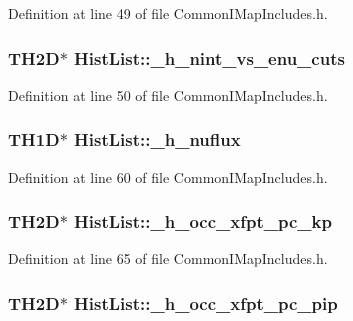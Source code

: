 Definition at line 49 of file Common\-I\-Map\-Includes.\-h.

\hypertarget{struct_hist_list_abad3b43d8ff27871b528111c3d11cef5}{
\subsubsection[{\-\_\-h\-\_\-nint\-\_\-vs\-\_\-enu\-\_\-cuts}]{\setlength{\rightskip}{0pt plus 5cm}T\-H2\-D$\ast$ Hist\-List\-::\-\_\-h\-\_\-nint\-\_\-vs\-\_\-enu\-\_\-cuts}}\label{struct_hist_list_abad3b43d8ff27871b528111c3d11cef5}


Definition at line 50 of file Common\-I\-Map\-Includes.\-h.

\hypertarget{struct_hist_list_af12f1c42bb40e8093ed4a05ea961a2ab}{
\subsubsection[{\-\_\-h\-\_\-nuflux}]{\setlength{\rightskip}{0pt plus 5cm}T\-H1\-D$\ast$ Hist\-List\-::\-\_\-h\-\_\-nuflux}}\label{struct_hist_list_af12f1c42bb40e8093ed4a05ea961a2ab}


Definition at line 60 of file Common\-I\-Map\-Includes.\-h.

\hypertarget{struct_hist_list_adfd90cd43bca67431c0b52392f44dc8d}{
\subsubsection[{\-\_\-h\-\_\-occ\-\_\-xfpt\-\_\-pc\-\_\-kp}]{\setlength{\rightskip}{0pt plus 5cm}T\-H2\-D$\ast$ Hist\-List\-::\-\_\-h\-\_\-occ\-\_\-xfpt\-\_\-pc\-\_\-kp}}\label{struct_hist_list_adfd90cd43bca67431c0b52392f44dc8d}


Definition at line 65 of file Common\-I\-Map\-Includes.\-h.

\hypertarget{struct_hist_list_a353a004cac0b31d7bb51a0b69b2fd897}{
\subsubsection[{\-\_\-h\-\_\-occ\-\_\-xfpt\-\_\-pc\-\_\-pip}]{\setlength{\rightskip}{0pt plus 5cm}T\-H2\-D$\ast$ Hist\-List\-::\-\_\-h\-\_\-occ\-\_\-xfpt\-\_\-pc\-\_\-pip}}\label{struct_hist_list_a353a004cac0b31d7bb51a0b69b2fd897}


